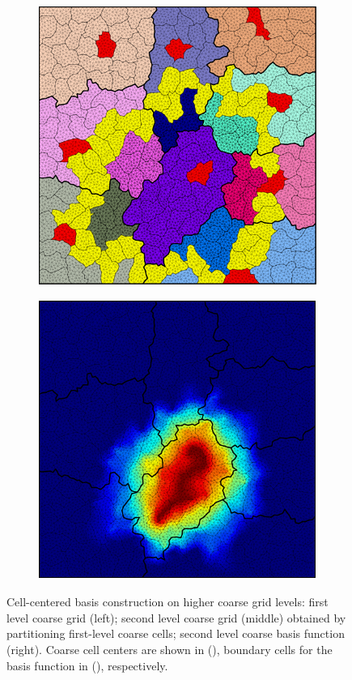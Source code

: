 \begin{figure}[htbp]
\begin{subfigure}[t]{0.3\textwidth}
  \end{subfigure}
  \hfill
  \begin{subfigure}[t]{0.3\textwidth}
    \centerline{\includegraphics[width=0.9\linewidth]{figs/square/square_tria_metis_cell_ml_lvl2_grid}}
  \end{subfigure}
  \hfill
  \begin{subfigure}[t]{0.3\textwidth}
    \centerline{\includegraphics[width=0.9\linewidth]{figs/square/square_tria_metis_cell_ml_lvl2_basis}}
  \end{subfigure}
  \caption[Higher level coarse grids and  cell-centered basis functions]{\label{fig:square_cell_ml} Cell-centered basis construction on higher coarse grid levels: first level coarse grid (left); second level coarse grid (middle) obtained by partitioning first-level coarse cells; second level coarse basis function (right).   Coarse cell centers are shown in (), boundary cells for the basis function in (), respectively.}
\end{figure}

